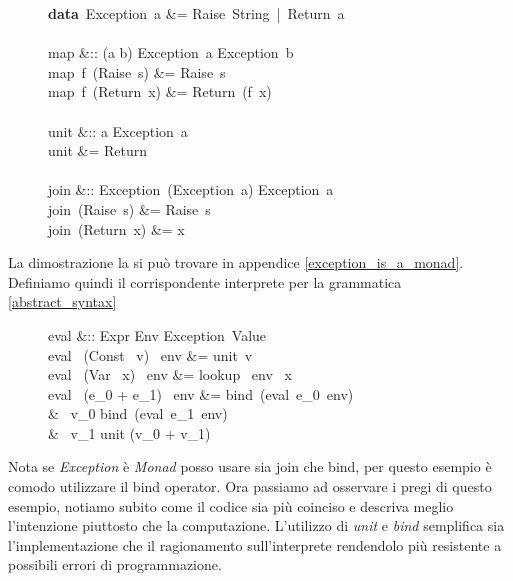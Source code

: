 \begin{figure}[H]
  \centering
  \footnotesize %
  \begin{haskellsyntax}
  \textbf{data}\ Exception\ a &= Raise\ String\ |\ Return\ a \\\\

  map &:: (a \to b) \to Exception\ a \to Exception\ b\\
  map\ f\ (Raise\ s) &= Raise\ s\\
  map\ f\ (Return\ x) &= Return\ (f\ x)\\\\

  unit &:: a \to Exception\ a\\
  unit &= Return\\\\

  join &:: Exception\ (Exception\ a) \to Exception\ a\\
  join\ (Raise\ s) &= Raise\ s\\
  join\ (Return\ x) &= x
  \end{haskellsyntax}%
\end{figure}
La dimostrazione la si può trovare in appendice \ref{exception_is_a_monad}.
Definiamo quindi il corrispondente interprete per la grammatica
\ref{abstract_syntax}
\begin{figure}[H]
  \centering
  \footnotesize %
  \begin{haskellsyntax}
  eval &:: Expr \to Env \to Exception\ Value\\
  eval \ (Const \ v) \ env &= unit\ v\\
  eval \ (Var \ x) \ env   &= lookup \ env \ x\\
  eval \ (e_0 + e_1) \ env &= bind\ (eval\ e_0\ env)\\
                           & \qquad \lambda\ v_0 \to bind\ (eval\ e_1\ env)\\
                           & \qquad \qquad \lambda\ v_1 \to unit (v_0 + v_1)
  \end{haskellsyntax}%
\end{figure}
Nota se \textit{Exception }è \textit{Monad} posso usare sia join che bind,
per questo esempio è comodo utilizzare il bind operator.
Ora passiamo ad osservare i pregi di questo esempio, notiamo subito come il
codice sia più coinciso e descriva meglio l'intenzione piuttosto che la
computazione.
L'utilizzo di \textit{unit} e \textit{bind} semplifica sia l'implementazione che
il ragionamento sull'interprete rendendolo più resistente a possibili errori di
programmazione.

